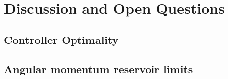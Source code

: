 \documentclass{llncs}
\begin{document}








\section{Discussion and Open Questions}
\label{sec:Discussion}


\subsection{Controller Optimality}


\subsection{Angular momentum reservoir limits}
\end{document}
